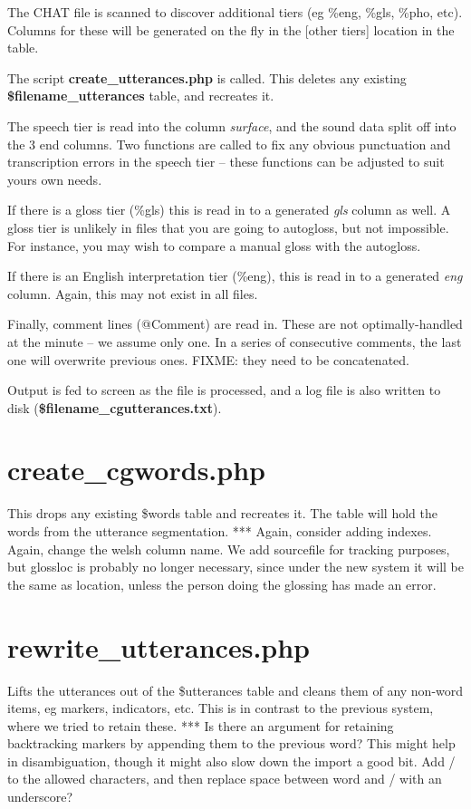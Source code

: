 \documentclass[a4paper,10pt]{article}
\begin{document}
{The CHAT file is scanned to discover additional tiers (eg \%eng, \%gls, \%pho, etc).  Columns for these will be generated on the fly in the [other tiers] location in the table.

The script \textbf{create\_utterances.php} is called.  This deletes any existing \textbf{\$filename\_utterances} table, and recreates it.

The speech tier is read into the column \textit{surface}, and the sound data split off into the 3 end columns.  Two functions are called to fix any obvious punctuation and transcription errors in the speech tier -- these functions can be adjusted to suit yours own needs.

If there is a gloss tier (\%gls) this is read in to a generated \textit{gls} column as well.  A gloss tier is unlikely in files that you are going to autogloss, but not impossible.  For instance, you may wish to compare a manual gloss with the autogloss.

If there is an English interpretation tier (\%eng), this is read in to a generated \textit{eng} column.  Again, this may not exist in all files.

Finally, comment lines (@Comment) are read in.  These are not optimally-handled at the minute -- we assume only one.  In a series of consecutive comments, the last one will overwrite previous ones.  FIXME: they need to be concatenated.

Output is fed to screen as the file is processed, and a log file is also written to disk (\textbf{\$filename\_cgutterances.txt}).


\section{create\_cgwords.php}
\label{sec:words}

This drops any existing \$words table and recreates it.  The table will hold the words from the utterance segmentation.
*** Again, consider adding indexes.  Again, change the welsh column name.  We add sourcefile for tracking purposes, but glossloc is probably no longer necessary, since under the new system it will be the same as location, unless the person doing the glossing has made an error.


\section{rewrite\_utterances.php}
\label{sec:rewrite}

Lifts the utterances out of the \$utterances table and cleans them of any non-word items, eg markers, indicators, etc.  This is in contrast to the previous system, where we tried to retain these.
*** Is there an argument for retaining backtracking markers by appending them to the previous word?  This might help in disambiguation, though it might also slow down the import a good bit.  Add / to the allowed characters, and then replace space between word and / with an underscore?

}
\end{document}
